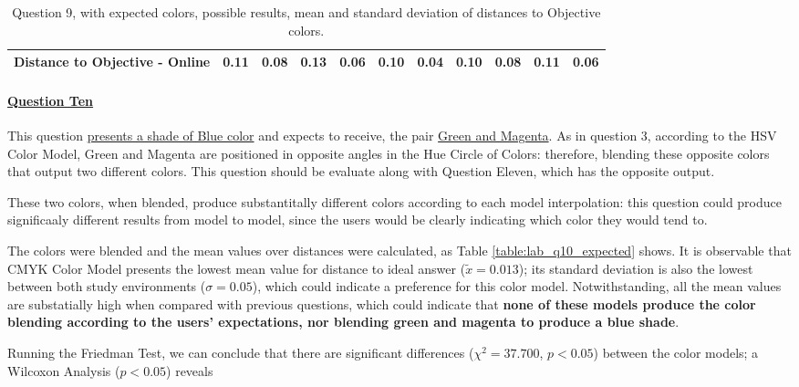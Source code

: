 \begin{table}[H]
{\begin{tabular}{lccccccccccccc}
    \multicolumn{4}{l}{Distance to Objective - Online}                                                                                               & \multicolumn{1}{|c}{0.11}        & \multicolumn{1}{c|}{0.08}    & \multicolumn{1}{|c}{0.13}        & \multicolumn{1}{c|}{0.06}    & \multicolumn{1}{|c}{\textbf{0.10}}       & \multicolumn{1}{c|}{0.04}    & \multicolumn{1}{|c}{\textbf{0.10}}        & \multicolumn{1}{c|}{0.08}    & \multicolumn{1}{|c}{0.11}       & \multicolumn{1}{c|}{0.06}    \\ \hline
    \end{tabular}}
  \caption[Question 9, with expected Results.]{Question 9, with expected colors, possible results, mean and standard deviation of distances to Objective colors.}
  \label{table:lab_q9_expected}
\end{table}
%
\paragraph{\ul{Question Ten}}
%
This question \ul{presents a shade of Blue color} and expects to receive, the pair \ul{Green and Magenta}. As in question 3, according to the HSV Color Model, Green and Magenta are positioned in
opposite angles in the Hue Circle of Colors: therefore, blending these opposite colors that output two different colors. This question should be evaluate along with Question Eleven, which has
the opposite output. \par
%
These two colors, when blended, produce substantitally different colors according to each model interpolation: this question could produce significaaly different results from model to model,
since the users would be clearly indicating which color they would tend to. \par
%
The colors were blended and the mean values over distances were calculated, as Table \ref{table:lab_q10_expected} shows. It is observable that CMYK Color Model presents
the lowest mean value for distance to ideal answer ($\tilde{x} = 0.013$); its standard deviation is also the lowest between both study environments ($\sigma = 0.05$), which could indicate a preference
for this color model. Notwithstanding, all the mean values are substatially high when compared with previous questions, which could indicate that \textbf{none of these models produce the color blending according
to the users' expectations, nor blending green and magenta to produce a blue shade}. \par
%
Running the Friedman Test, we can conclude that there are significant differences ($\chi^2 = 37.700$, $p < 0.05$) between the color models; a Wilcoxon Analysis ($p < 0.05$) reveals
